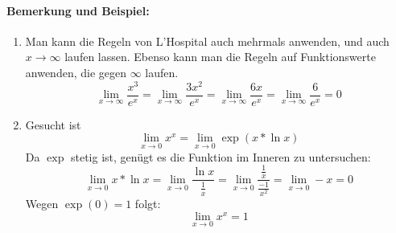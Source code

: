 \paragraph{Bemerkung und Beispiel:}
\begin{enumerate}
	\item Man kann die Regeln von L'Hospital auch mehrmals anwenden, und auch $x\to\infty$ laufen lassen. Ebenso kann man die Regeln auf Funktionswerte anwenden, die gegen $\infty$ laufen.
	\begin{equation*}
		\lim\limits_{x\to\infty}\frac{x^3}{e^x}=\lim\limits_{x\to\infty}\frac{3x^2}{e^x}=\lim\limits_{x\to\infty}\frac{6x}{e^x}=\lim\limits_{x\to\infty}\frac{6}{e^x}=0
	\end{equation*}
	\item Gesucht ist
	\begin{equation*}
		\lim\limits_{x\to 0}x^x=\lim\limits_{x\to 0}\exp(x*\ln x)
	\end{equation*}
	Da $\exp$ stetig ist, genügt es die Funktion im Inneren zu untersuchen:
	\begin{equation*}
		\lim\limits_{x\to 0}x*\ln x=\lim\limits_{x\to 0}\frac{\ln x}{\frac 1x}=\lim\limits_{x\to 0}\frac{\frac 1x}{\frac{-1}{x^2}}=\lim\limits_{x\to 0}-x=0
	\end{equation*}
	Wegen $\exp(0)=1$ folgt:
	\begin{equation*}
		\lim\limits_{x\to 0}x^x=1
	\end{equation*}
\end{enumerate}
